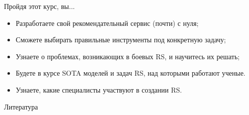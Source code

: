 \documentclass[11pt,aspectratio=169,handout]{beamer}
\begin{document}
\begin{frame}{Пройдя этот курс, вы...}

\begin{itemize}
\item Разработаете свой рекомендательный сервис (почти) с нуля;
\item Сможете выбирать правильные инструменты под конкретную задачу;
\item Узнаете о проблемах, возникающих в боевых RS, и научитесь их решать;
\item Будете в курсе SOTA моделей и задач RS, над которыми работают ученые.
\item Узнаете, какие специалисты участвуют в создании RS.
\end{itemize}

\end{frame}

{
\begin{frame}[plain]
\end{frame}
}

\begin{frame}[allowframebreaks]{Литература}


\end{frame}
\end{document}
